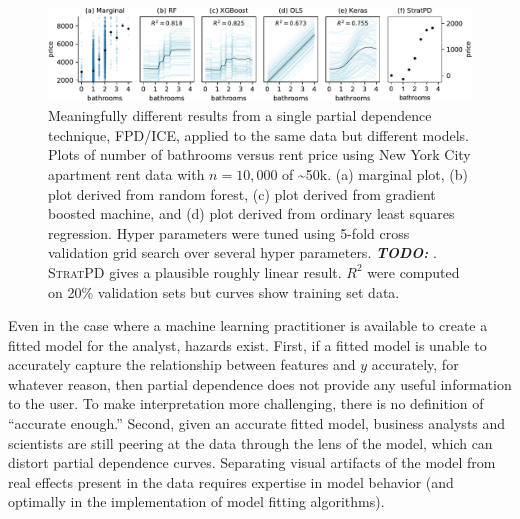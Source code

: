 \documentclass[smallextended]{svjour3}       %
\newcommand{\todo}[1]{{\bf\em TODO:} {{\color{red}{#1}}}}
\newcommand{\spd}{\fontfamily{cmr}\textsc{\small StratPD}}
\begin{document}
\begin{figure}
\begin{center}
\includegraphics[scale=0.51]{images/bathrooms_vs_price.pdf}\vspace{-3mm}
\caption{\small Meaningfully different results from a single partial dependence technique, FPD/ICE, applied to the same data but different models. Plots of number of bathrooms versus rent price using New York City apartment rent data \cite{rent} with $n=10,000$ of \textasciitilde50k. (a) marginal plot, (b) plot derived from random forest, (c)  plot derived from gradient boosted machine, and (d) plot derived from ordinary least squares regression. Hyper parameters were tuned using 5-fold cross validation grid search over several hyper parameters. \todo{Keras}.
\spd{} gives a plausible roughly linear result. $R^2$ were computed on 20\% validation sets but curves show training set data.\vspace{-7mm}}
\label{fig:baths_price}
\end{center}
\end{figure}

Even in the case where a machine learning practitioner is available to create a fitted model for the analyst, hazards exist. First, if a fitted model is unable to accurately capture the relationship between features and $y$ accurately, for whatever reason, then partial dependence does not provide any useful information to the user.  To make interpretation more challenging, there is no definition of ``accurate enough.'' Second, given an accurate fitted model, business analysts and scientists are still peering at the data through the lens of the model, which can distort partial dependence curves. Separating visual artifacts of the model from real effects present in the data requires expertise in model behavior (and optimally in the implementation of model fitting algorithms). 
\end{document}
